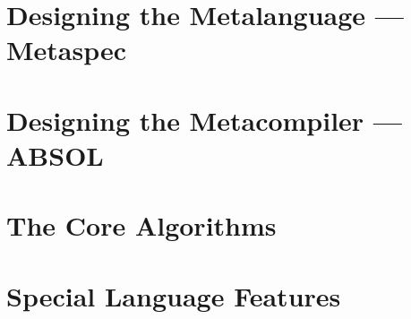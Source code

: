 
\section{Designing the Metalanguage --- Metaspec} %
\label{sec:designing_the_metalanguage_metaspec}



\section{Designing the Metacompiler --- ABSOL} %
\label{sec:designing_the_metacompiler_absol}


\section{The Core Algorithms} %
\label{sec:the_core_algorithms}


\section{Special Language Features} %
\label{sec:special_language_features}



